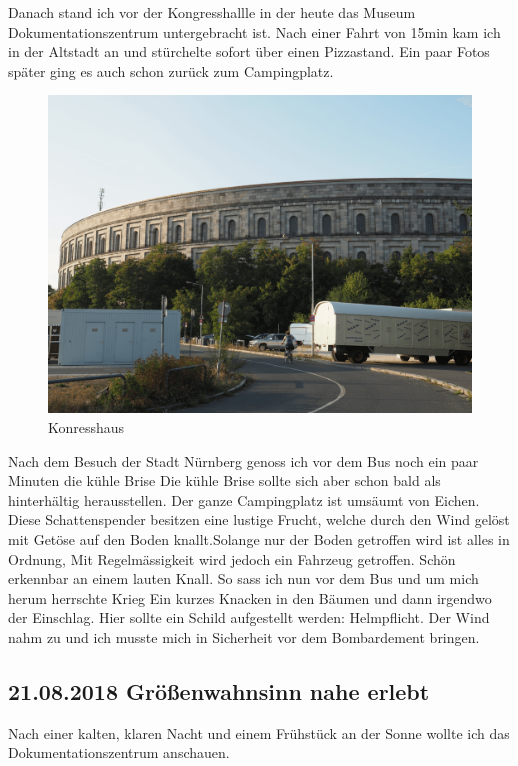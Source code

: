 \newpage

Danach stand ich vor der Kongresshallle in der heute das Museum \glqq Dokumentationszentrum\grqq{} untergebracht ist. 
Nach einer Fahrt von 15min kam ich in der Altstadt an und stürchelte sofort über einen Pizzastand.
Ein paar Fotos später ging es auch schon zurück zum Campingplatz.

\begin{figure}[h]
    \centering
    \includegraphics[width=\textwidth]{../Bilder/Sylt/65.png}
    \caption{Konresshaus}
    \label{img:Konresshaus}
\end{figure}

Nach dem Besuch der Stadt Nürnberg genoss ich vor dem Bus noch ein paar Minuten die kühle Brise
Die kühle Brise sollte sich aber schon bald als hinterhältig herausstellen.
Der ganze Campingplatz ist umsäumt von Eichen.
Diese Schattenspender besitzen eine lustige Frucht, welche durch den Wind gelöst mit Getöse auf den Boden knallt.Solange nur der Boden getroffen wird ist alles in Ordnung,
Mit Regelmässigkeit wird jedoch ein Fahrzeug getroffen.
Schön erkennbar an einem lauten Knall.
So sass ich nun vor dem Bus und um mich herum herrschte Krieg
Ein kurzes Knacken in den Bäumen und dann irgendwo der Einschlag.
Hier sollte ein Schild aufgestellt werden: Helmpflicht.
Der Wind nahm zu und ich musste mich in Sicherheit vor dem Bombardement bringen.

\newpage 

\subsection{21.08.2018 Größenwahnsinn nahe erlebt}
Nach einer kalten, klaren Nacht und einem Frühstück an der Sonne wollte ich das Dokumentationszentrum anschauen.

